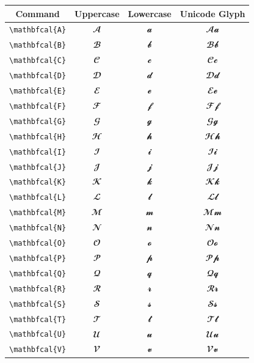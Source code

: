 \documentclass[12pt,a4paper]{article}
\begin{document}
\begin{longtable}{|c|c|c|c|}
\hline
\textbf{Command} & \textbf{Uppercase} & \textbf{Lowercase} & \textbf{Unicode Glyph} \\
\hline
\verb|\mathbfcal{A}| & $\mathbfcal{A}$ & $\mathbfcal{a}$ & $ 𝓐 𝓪 $ \\
\verb|\mathbfcal{B}| & $\mathbfcal{B}$ & $\mathbfcal{b}$ & $ 𝓑 𝓫 $ \\
\verb|\mathbfcal{C}| & $\mathbfcal{C}$ & $\mathbfcal{c}$ & $ 𝓒 𝓬 $ \\
\verb|\mathbfcal{D}| & $\mathbfcal{D}$ & $\mathbfcal{d}$ & $ 𝓓 𝓭 $ \\
\verb|\mathbfcal{E}| & $\mathbfcal{E}$ & $\mathbfcal{e}$ & $ 𝓔 𝓮 $ \\
\verb|\mathbfcal{F}| & $\mathbfcal{F}$ & $\mathbfcal{f}$ & $ 𝓕 𝓯 $ \\
\verb|\mathbfcal{G}| & $\mathbfcal{G}$ & $\mathbfcal{g}$ & $ 𝓖 𝓰 $ \\
\verb|\mathbfcal{H}| & $\mathbfcal{H}$ & $\mathbfcal{h}$ & $ 𝓗 𝓱 $ \\
\verb|\mathbfcal{I}| & $\mathbfcal{I}$ & $\mathbfcal{i}$ & $ 𝓘 𝓲 $ \\
\verb|\mathbfcal{J}| & $\mathbfcal{J}$ & $\mathbfcal{j}$ & $ 𝓙 𝓳 $ \\
\verb|\mathbfcal{K}| & $\mathbfcal{K}$ & $\mathbfcal{k}$ & $ 𝓚 𝓴 $ \\
\verb|\mathbfcal{L}| & $\mathbfcal{L}$ & $\mathbfcal{l}$ & $ 𝓛 𝓵 $ \\
\verb|\mathbfcal{M}| & $\mathbfcal{M}$ & $\mathbfcal{m}$ & $ 𝓜 𝓶 $ \\
\verb|\mathbfcal{N}| & $\mathbfcal{N}$ & $\mathbfcal{n}$ & $ 𝓝 𝓷 $ \\
\verb|\mathbfcal{O}| & $\mathbfcal{O}$ & $\mathbfcal{o}$ & $ 𝓞 𝓸 $ \\
\verb|\mathbfcal{P}| & $\mathbfcal{P}$ & $\mathbfcal{p}$ & $ 𝓟 𝓹 $ \\
\verb|\mathbfcal{Q}| & $\mathbfcal{Q}$ & $\mathbfcal{q}$ & $ 𝓠 𝓺 $ \\
\verb|\mathbfcal{R}| & $\mathbfcal{R}$ & $\mathbfcal{r}$ & $ 𝓡 𝓻 $ \\
\verb|\mathbfcal{S}| & $\mathbfcal{S}$ & $\mathbfcal{s}$ & $ 𝓢 𝓼 $ \\
\verb|\mathbfcal{T}| & $\mathbfcal{T}$ & $\mathbfcal{t}$ & $ 𝓣 𝓽 $ \\
\verb|\mathbfcal{U}| & $\mathbfcal{U}$ & $\mathbfcal{u}$ & $ 𝓤 𝓾 $ \\
\verb|\mathbfcal{V}| & $\mathbfcal{V}$ & $\mathbfcal{v}$ & $ 𝓥 𝓿 $ \\

\end{longtable}
\end{document}
